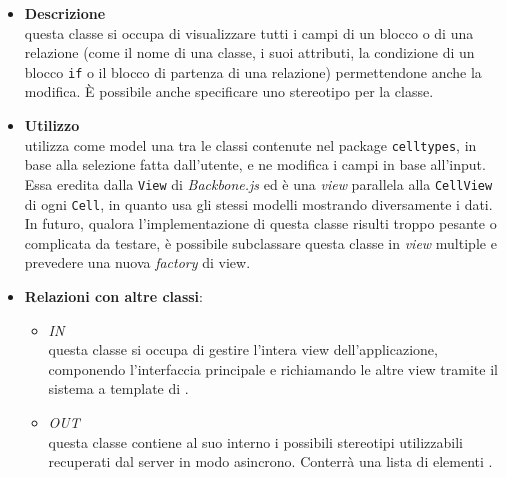\label{\nogloxy{swedesigner::client::view::DetailsView}}
\begin{itemize}
\item \textbf{Descrizione}\\
questa classe si occupa di visualizzare tutti i campi di un blocco o di una relazione (come il nome di una classe, i suoi attributi, la condizione di un blocco \texttt{if} o il blocco di partenza di una relazione) permettendone anche la modifica. È possibile anche specificare uno stereotipo per la classe.

\item \textbf{Utilizzo}\\
utilizza come model una tra le classi contenute nel package \texttt{celltypes}, in base alla selezione fatta dall'utente, e ne modifica i campi in base all'input. Essa eredita dalla \texttt{View} di \emph{Backbone.js} ed è una \emph{view} parallela alla \texttt{CellView} di ogni \texttt{Cell}, in quanto usa gli stessi modelli mostrando diversamente i dati.
In futuro, qualora l'implementazione di questa classe risulti troppo pesante o complicata da testare, è possibile subclassare questa classe in \emph{view} multiple e prevedere una nuova \emph{factory} di view.
\item \textbf{Relazioni con altre classi}:
\begin{itemize}
\item \textit{IN} \hyperref[\nogloxy{swedesigner::client::view::AppView}]{}\\
questa classe si occupa di gestire l'intera view dell'applicazione, componendo l'interfaccia principale e richiamando le altre view tramite il sistema a template di \backbonejs{}.
\item \textit{OUT} \hyperref[\nogloxy{swedesigner::client::model::utility::ProjectStereotypes}]{}\\
questa classe contiene al suo interno i possibili stereotipi utilizzabili recuperati dal server in modo asincrono. Conterrà una lista di elementi .
\end{itemize}
\end{itemize}

